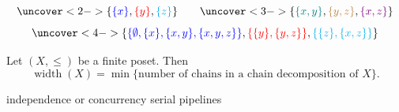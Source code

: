 \begin{frame}{}
  \[
    \uncover<2->{\set{\blue{\set{x}}, \red{\set{y}}, \cyan{\set{z}}}}
    \qquad
    \uncover<3->{\set{\teal{\set{x, y}}, \brown{\set{y, z}}, \violet{\set{x, z}}}}
  \]
  \[
    \uncover<4->{\set{\blue{\set{\emptyset, \set{x}, \set{x, y}, \set{x, y, z}}},
      \red{\set{\set{y}, \set{y, z}}}, \cyan{\set{\set{z}, \set{x, z}}}}}
  \]
\end{frame}

\begin{frame}{}
\end{frame}

\begin{frame}{}
\end{frame}

\begin{frame}{}
\end{frame}

\begin{frame}{}
\end{frame}

\begin{frame}{}
\end{frame}

\begin{frame}{}
  \begin{theorem}
    Let $(X,\le)$ be a finite poset. Then
    \[
      \operatorname{width}(X) =
      \min\{\text{number of chains in a chain decomposition of }X\}.
    \]
  \end{theorem}

  \pause
  \begin{center}
     independence or concurrency
    \vspace{-0.30cm}
     serial pipelines
  \end{center}
\end{frame}

